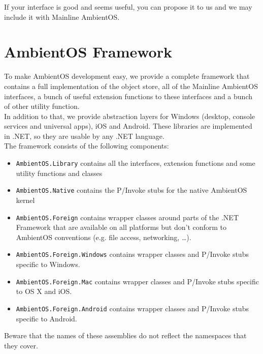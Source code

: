 \documentclass[a4paper]{article}
\begin{document}
If your interface is good and seems useful, you can propose it to us and we may include it with Mainline AmbientOS.



\section{AmbientOS Framework}

To make AmbientOS development easy, we provide a complete framework that contains a full implementation of the object store, all of the Mainline AmbientOS interfaces, a bunch of useful extension functions to these interfaces and a bunch of other utility function. \\
In addition to that, we provide abstraction layers for Windows (desktop, console services and universal apps), iOS and Android. These libraries are implemented in .NET, so they are usable by any .NET language. \\

The framework consists of the following components:

\begin{itemize}
  \item {\tt AmbientOS.Library} contains all the interfaces, extension functions and some utility functions and classes
  \item {\tt AmbientOS.Native} contains the P/Invoke stubs for the native AmbientOS kernel
  \item {\tt AmbientOS.Foreign} contains wrapper classes around parts of the .NET Framework that are available on all platforms but don't conform to AmbientOS conventions (e.g. file access, networking, \ldots).
  \item {\tt AmbientOS.Foreign.Windows} contains wrapper classes and P/Invoke stubs specific to Windows.
  \item {\tt AmbientOS.Foreign.Mac} contains wrapper classes and P/Invoke stubs specific to OS X and iOS.
  \item {\tt AmbientOS.Foreign.Android} contains wrapper classes and P/Invoke stubs specific to Android.
\end{itemize}

Beware that the names of these assemblies do not reflect the namespaces that they cover.
\end{document}
